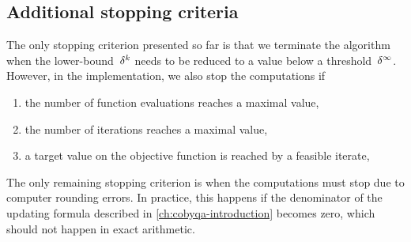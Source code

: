 \subsection{Additional stopping criteria}

The only stopping criterion presented so far is that we terminate the algorithm when the lower-bound~$\radlb[k]$ needs to be reduced to a value below a threshold~$\radlb[\infty]$.
However, in the implementation, we also stop the computations if
\begin{enumerate}
    \item the number of function evaluations reaches a maximal value,
    \item the number of iterations reaches a maximal value,
    \item a target value on the objective function is reached by a feasible iterate,
\end{enumerate}
The only remaining stopping criterion is when the computations must stop due to computer rounding errors.
In practice, this happens if the denominator of the updating formula described in \cref{ch:cobyqa-introduction} becomes zero, which should not happen in exact arithmetic.


